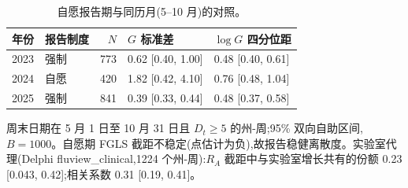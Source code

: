 \begin{table}[htbp]
\centering
\footnotesize
\caption{自愿报告期与同历月(5--10 月)的对照。}
\label{tab:s4}
\begin{tabular}{llrll}
\toprule
年份 & 报告制度 & $N$ & $G$ 标准差 & $\log G$ 四分位距 \\
\midrule
2023 & 强制 & 773 & 0.62 [0.40, 1.00] & 0.48 [0.40, 0.61] \\
2024 & 自愿 & 420 & 1.82 [0.42, 4.10] & 0.76 [0.48, 1.04] \\
2025 & 强制 & 841 & 0.39 [0.33, 0.44] & 0.48 [0.37, 0.58] \\
\bottomrule
\end{tabular}
\par\smallskip
\begin{minipage}{0.95\linewidth}\scriptsize 周末日期在 5 月 1 日至 10 月 31 日且 $D_t\ge 5$ 的州-周;95\% 双向自助区间,$B=1000$。自愿期 FGLS 截距不稳定(点估计为负),故报告稳健离散度。实验室代理(Delphi fluview\_clinical,1224 个州-周):$R_A$ 截距中与实验室增长共有的份额 0.23 [0.043, 0.42];相关系数 0.31 [0.19, 0.41]。\end{minipage}
\end{table}
